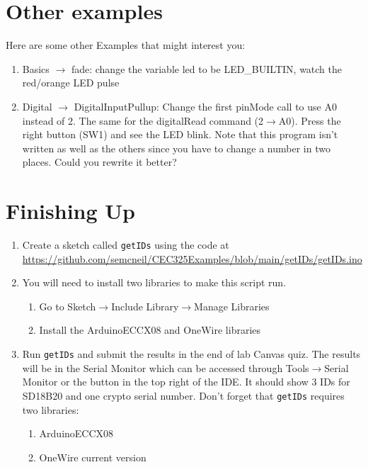 \section{Other examples}
	Here are some other Examples that might interest you:
	\begin{enumerate}
		\item Basics $\rightarrow$ fade: change the variable led to be LED\_BUILTIN, watch the red/orange LED pulse
		\item Digital $\rightarrow$ DigitalInputPullup: Change the first pinMode call to use A0 instead of 2. The same for 
				the digitalRead command (2$\rightarrow$A0). Press the right button (SW1) and see the LED blink. 
				 Note that this program isn't written as well as the others since you have to change a number in two
				places. Could you rewrite it better?
	\end{enumerate}

\section{Finishing Up}
  \begin{enumerate}
    \item Create a sketch called \lstinline$getIDs$ using the code at \\ 
        \href{https://github.com/semcneil/CEC325Examples/blob/main/getIDs/getIDs.ino}{https://github.com/semcneil/CEC325Examples/blob/main/getIDs/getIDs.ino}
    \item You will need to install two libraries to make this script run.
    \begin{enumerate}
        \item Go to Sketch$\rightarrow$Include Library$\rightarrow$Manage Libraries 
        \item Install the ArduinoECCX08 and OneWire libraries
    \end{enumerate}
    \item Run \lstinline$getIDs$ and submit the results in the end of lab Canvas quiz. The results will be 
                in the Serial Monitor which can be accessed through Tools$\rightarrow$Serial Monitor or the 
                button in the top right of the IDE. It should show 3 IDs for SD18B20 and one crypto serial 
                number. Don't forget that \lstinline$getIDs$ requires two libraries:
        \begin{enumerate}
            \item ArduinoECCX08
            \item OneWire current version
        \end{enumerate}
\end{enumerate}

